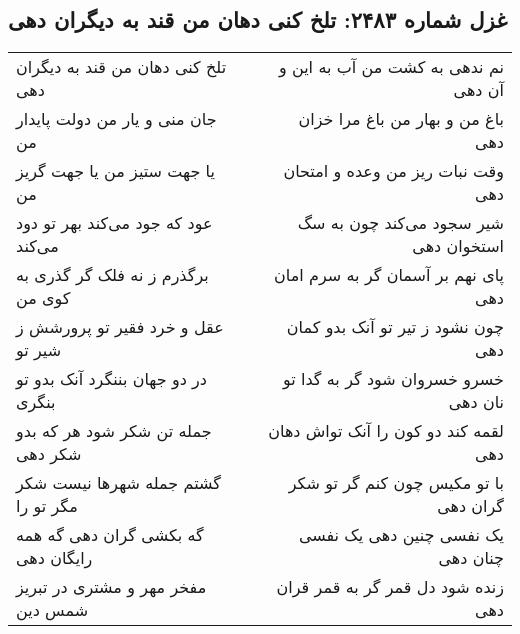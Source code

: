\begin{center}
\section*{غزل شماره ۲۴۸۳: تلخ کنی دهان من قند به دیگران دهی}
\label{sec:2483}
\begin{longtable}{l p{0.5cm} r}
تلخ کنی دهان من قند به دیگران دهی
&&
نم ندهی به کشت من آب به این و آن دهی
\\
جان منی و یار من دولت پایدار من
&&
باغ من و بهار من باغ مرا خزان دهی
\\
یا جهت ستیز من یا جهت گریز من
&&
وقت نبات ریز من وعده و امتحان دهی
\\
عود که جود می‌کند بهر تو دود می‌کند
&&
شیر سجود می‌کند چون به سگ استخوان دهی
\\
برگذرم ز نه فلک گر گذری به کوی من
&&
پای نهم بر آسمان گر به سرم امان دهی
\\
عقل و خرد فقیر تو پرورشش ز شیر تو
&&
چون نشود ز تیر تو آنک بدو کمان دهی
\\
در دو جهان بننگرد آنک بدو تو بنگری
&&
خسرو خسروان شود گر به گدا تو نان دهی
\\
جمله تن شکر شود هر که بدو شکر دهی
&&
لقمه کند دو کون را آنک تواش دهان دهی
\\
گشتم جمله شهرها نیست شکر مگر تو را
&&
با تو مکیس چون کنم گر تو شکر گران دهی
\\
گه بکشی گران دهی گه همه رایگان دهی
&&
یک نفسی چنین دهی یک نفسی چنان دهی
\\
مفخر مهر و مشتری در تبریز شمس دین
&&
زنده شود دل قمر گر به قمر قران دهی
\\
\end{longtable}
\end{center}

